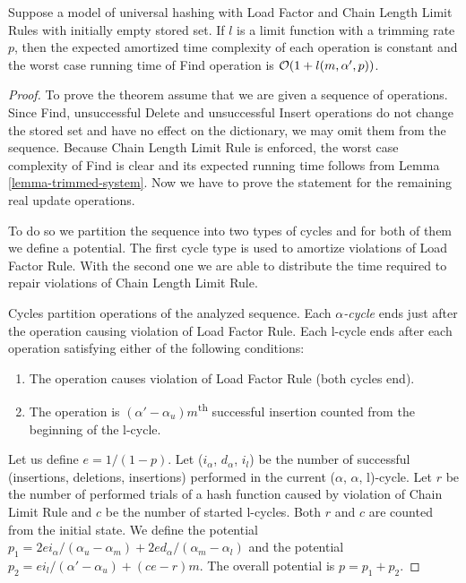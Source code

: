 \begin{theorem}
\label{theorem-amortised-expected-time}
Suppose a model of universal hashing with Load Factor and Chain Length Limit Rules with initially empty stored set. If $l$ is a limit function with a trimming rate $p$, then the expected amortized time complexity of each operation is constant and the worst case running time of Find operation is $\mathcal{O}(1 + l(m, \alpha', p))$.
\end{theorem}
\begin{proof}
To prove the theorem assume that we are given a sequence of operations. Since Find, unsuccessful Delete and unsuccessful Insert operations do not change the stored set and have no effect on the dictionary, we may omit them from the sequence. Because Chain Length Limit Rule is enforced, the worst case complexity of Find is clear and its expected running time follows from Lemma \ref{lemma-trimmed-system}. Now we have to prove the statement for the remaining real update operations.

To do so we partition the sequence into two types of cycles and for both of them we define a potential. The first cycle type is used to amortize violations of Load Factor Rule. With the second one we are able to distribute the time required to repair violations of Chain Length Limit Rule.

\begin{definition}
Cycles partition operations of the analyzed sequence.
Each \emph{$\alpha$-cycle} ends just after the operation causing violation of Load Factor Rule.
Each l-cycle ends after each operation satisfying either of the following conditions:
\begin{enumerate}
\item The operation causes violation of Load Factor Rule (both cycles end).
\item The operation is $(\alpha' - \alpha_u) m$\textsuperscript{th} successful insertion counted from the beginning of the l-cycle.
\end{enumerate}
\end{definition}

Let us define $e = 1/(1-p)$. Let ($i_{\alpha}$, $d_\alpha$, $i_l$) be the number of successful (insertions, deletions, insertions) performed in the current ($\alpha$, $\alpha$, l)-cycle. Let $r$ be the number of performed trials of a hash function caused by violation of Chain Limit Rule and $c$ be the number of started l-cycles. Both $r$ and $c$ are counted from the initial state. We define the potential $p_1 = {2ei_{\alpha}}/{(\alpha_u - \alpha_m)} + {2ed_{\alpha}}/{(\alpha_m - \alpha_l)}$ and the potential $p_2 = {ei_{l}}/{(\alpha' - \alpha_u)} + (ce - r) m$.  The overall potential is $p = p_1 + p_2$.


\end{proof}
